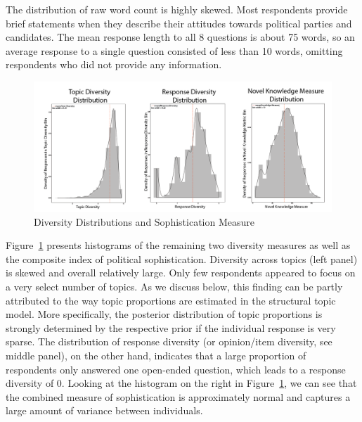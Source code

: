 \documentclass[12pt]{article}
\begin{document}
The distribution of raw word count is highly skewed. Most respondents provide brief statements when they describe their attitudes towards political parties and candidates. The mean response length to all 8 questions is about 75 words, so an average response to a single question consisted of less than 10 words, omitting respondents who did not provide any information.
\begin{figure}[h]
\includegraphics[width=\textwidth]{../fig/diversity_distributions.png}
\caption{Diversity Distributions and Sophistication Measure}\label{fig:diversity}
\end{figure}

Figure~\ref{fig:diversity} presents histograms of the remaining two diversity measures as well as the composite index of political sophistication. Diversity across topics (left panel) is skewed and overall relatively large. Only few respondents appeared to focus on a very select number of topics. As we discuss below, this finding can be partly attributed to the way topic proportions are estimated in the structural topic model. More specifically, the posterior distribution of topic proportions is strongly determined by the respective prior if the individual response is very sparse. The distribution of response diversity (or opinion/item diversity, see middle panel), on the other hand, indicates that a large proportion of respondents only answered one open-ended question, which leads to a response diversity of 0. Looking at the histogram on the right in Figure~\ref{fig:diversity}, we can see that the combined measure of sophistication is approximately normal and captures a large amount of variance between individuals.
\end{document}
